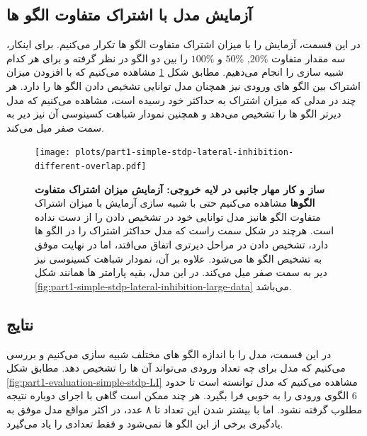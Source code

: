     \subsection{آزمایش مدل با اشتراک متفاوت الگو ها}
        در این قسمت، آزمایش را با میزان اشتراک متفاوت الگو ها تکرار می‌کنیم. برای اینکار، سه مقدار متفاوت 
        $20\%$, $50\%$ و $100\%$
        را بین دو الگو در نظر گرفته و برای هر کدام شبیه سازی را انجام می‌دهیم. مطابق شکل 
        \ref{fig:part1-simple-stdp-lateral-inhibition-different-overlap}
        مشاهده می‌کنیم که با افزودن میزان اشتراک بین الگو های ورودی نیز همچنان مدل توانایی تشخیص دادن الگو ها را دارد. هر چند در مدلی که میزان اشتراک به حداکثر خود رسیده است، مشاهده می‌کنیم که مدل دیرتر الگو ها را تشخیص می‌دهد و همچنین نمودار شباهت کسینوسی آن نیز دیر به سمت صفر میل می‌کند.
        \begin{figure}[!ht]
            \centering
            \texttt{[image: plots/part1-simple-stdp-lateral-inhibition-different-overlap.pdf]} 
            \captionsetup{width=.85\linewidth}
            \caption{\textbf{ ساز و کار مهار جانبی در لایه خروجی: آزمایش میزان اشتراک متفاوت الگوها} 
            مشاهده می‌کنیم حتی با شبیه سازی آزمایش با میزان اشتراک متفاوت الگو هانیز مدل توانایی خود در تشخیص دادن را از دست نداده است. هرچند در شکل سمت راست که مدل حداکثر اشتراک را در الگو ها دارد، تشخیص دادن در مراحل دیرتری اتفاق می‌افتد، اما در نهایت موفق به تشخیص الگو ها می‌شود. علاوه بر آن، نمودار شباهت کسینوسی نیز دیر به سمت صفر میل می‌کند. در این مدل، بقیه پارامتر ها همانند شکل 
            \ref{fig:part1-simple-stdp-lateral-inhibition-large-data} 
            می‌باشد.
            }
            \label{fig:part1-simple-stdp-lateral-inhibition-different-overlap}
        \end{figure}
    \subsection{نتایج}
        در این قسمت، مدل را با اندازه الگو های مختلف شبیه سازی می‌کنیم و بررسی می‌کنیم که مدل برای چه تعداد ورودی می‌تواند آن ها را تشخیص دهد. مطابق شکل 
        \ref{fig:part1-evaluation-simple-stdp-LI}
        مشاهده می‌کنیم که مدل توانسته است تا حدود 6 الگوی ورودی را به خوبی فرا بگیرد. هر چند ممکن است گاهی با اجرای دوباره نتیجه مطلوب گرفته نشود. اما با بیشتر شدن این تعداد تا ۸ عدد، در اکثر مواقع مدل موفق به یادگیری برخی از این الگو ها نمی‌شود و فقط تعدادی را یاد می‌گیرد.

